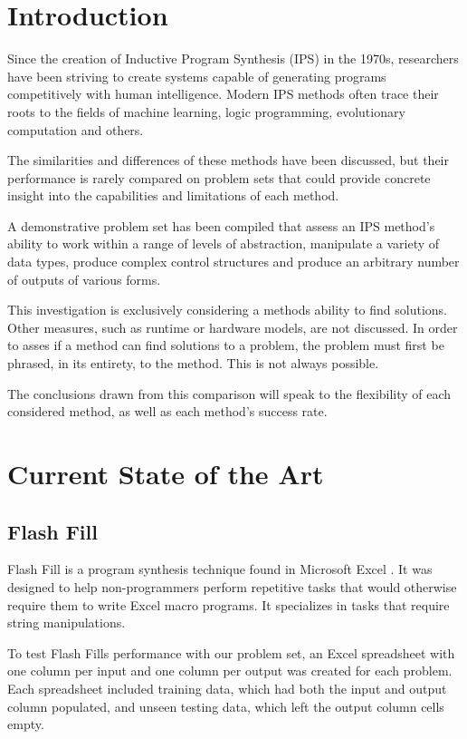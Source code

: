 \section{Introduction}

Since the creation of Inductive Program Synthesis (IPS) in the 1970s\cite{Kitzelmann2009}, researchers have been striving to create systems capable of generating programs competitively with human intelligence. Modern IPS methods often trace their roots to the fields of machine learning, logic programming, evolutionary computation and others.

The similarities and differences of these methods have been discussed\cite{Kitzelmann2009}, but their performance is rarely compared on problem sets that could provide concrete insight into the capabilities and limitations of each method.

A demonstrative problem set has been compiled that assess an IPS method's ability to work within a range of levels of abstraction\cite{Gaunt2016}, manipulate a variety of data types, produce complex control structures and produce an arbitrary number of outputs of various forms\cite{Helmuth2015b}.

This investigation is exclusively considering a methods ability to find solutions. Other measures, such as runtime or hardware models, are not discussed. In order to asses if a method can find solutions to a problem, the problem must first be phrased, in its entirety, to the method. This is not always possible.

The conclusions drawn from this comparison will speak to the flexibility of each considered method, as well as each method's success rate.

\section{Current State of the Art}



\subsection{Flash Fill}

Flash Fill is a program synthesis technique found in Microsoft Excel \cite{Gulwani2011}. It was designed to help non-programmers perform repetitive tasks that would otherwise require them to write Excel macro programs. It specializes in tasks that require string manipulations. 

To test Flash Fills performance with our problem set, an Excel spreadsheet with one column per input and one column per output was created for each problem. Each spreadsheet included training data, which had both the input and output column populated, and unseen testing data, which left the output column cells empty.

